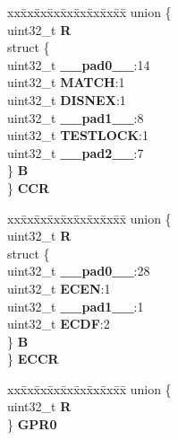 \begin{DoxyCompactItemize}
\begin{tabbing}
\end{tabbing}\item 
\mbox{\label{structSIU__tag_a4d73f6a02a6be7b385f53f01bc3f8c2b}} 
\begin{tabbing}
xx\=xx\=xx\=xx\=xx\=xx\=xx\=xx\=xx\=\kill
union \{\\
\>uint32\_t {\bfseries R}\\
\>struct \{\\
\>\>uint32\_t {\bfseries \_\_pad0\_\_}:14\\
\>\>uint32\_t {\bfseries MATCH}:1\\
\>\>uint32\_t {\bfseries DISNEX}:1\\
\>\>uint32\_t {\bfseries \_\_pad1\_\_}:8\\
\>\>uint32\_t {\bfseries TESTLOCK}:1\\
\>\>uint32\_t {\bfseries \_\_pad2\_\_}:7\\
\>\} {\bfseries B}\\
\} {\bfseries CCR}\\

\end{tabbing}\item 
\mbox{\label{structSIU__tag_acda6482237d2fd35b1bd5d46cccebee5}} 
\begin{tabbing}
xx\=xx\=xx\=xx\=xx\=xx\=xx\=xx\=xx\=\kill
union \{\\
\>uint32\_t {\bfseries R}\\
\>struct \{\\
\>\>uint32\_t {\bfseries \_\_pad0\_\_}:28\\
\>\>uint32\_t {\bfseries ECEN}:1\\
\>\>uint32\_t {\bfseries \_\_pad1\_\_}:1\\
\>\>uint32\_t {\bfseries ECDF}:2\\
\>\} {\bfseries B}\\
\} {\bfseries ECCR}\\

\end{tabbing}\item 
\mbox{\label{structSIU__tag_a7382c1cb7f6f4996e5899c8fe14e2162}} 
\begin{tabbing}
xx\=xx\=xx\=xx\=xx\=xx\=xx\=xx\=xx\=\kill
union \{\\
\>uint32\_t {\bfseries R}\\
\} {\bfseries GPR0}\\


\end{tabbing}
\end{DoxyCompactItemize}
